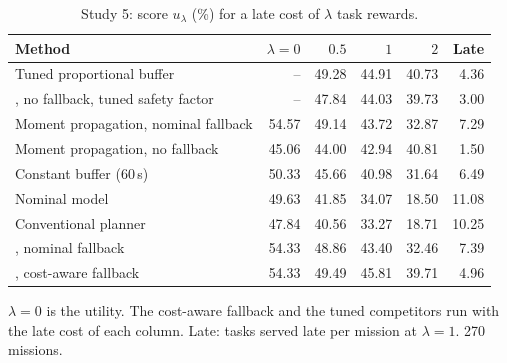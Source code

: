 \begin{table}[t]
\caption{Study 5: score $u_\lambda$ (\%) for a late cost of $\lambda$ task rewards.}\label{tab:s5}
\centering\small
\begin{threeparttable}
\begin{tabular}{lrrrrr}
\toprule
Method & $\lambda = 0$ & $0.5$ & $1$ & $2$ & Late \\
\midrule
Tuned proportional buffer & -- & 49.28 & 44.91 & 40.73 & 4.36 \\
\mname{}, no fallback, tuned safety factor & -- & 47.84 & 44.03 & 39.73 & 3.00 \\
Moment propagation, nominal fallback & 54.57 & 49.14 & 43.72 & 32.87 & 7.29 \\
Moment propagation, no fallback & 45.06 & 44.00 & 42.94 & 40.81 & 1.50 \\
Constant buffer (60\,s) & 50.33 & 45.66 & 40.98 & 31.64 & 6.49 \\
Nominal model & 49.63 & 41.85 & 34.07 & 18.50 & 11.08 \\
Conventional planner & 47.84 & 40.56 & 33.27 & 18.71 & 10.25 \\
\mname{}, nominal fallback & 54.33 & 48.86 & 43.40 & 32.46 & 7.39 \\
\mname{}, cost-aware fallback & 54.33 & 49.49 & 45.81 & 39.71 & 4.96 \\
\bottomrule
\end{tabular}
\begin{tablenotes}[flushleft]\scriptsize
\item[] $\lambda=0$ is the utility. The cost-aware fallback and the tuned competitors run with the late cost of each column. Late: tasks served late per mission at $\lambda=1$. 270 missions.
\end{tablenotes}
\end{threeparttable}
\end{table}
